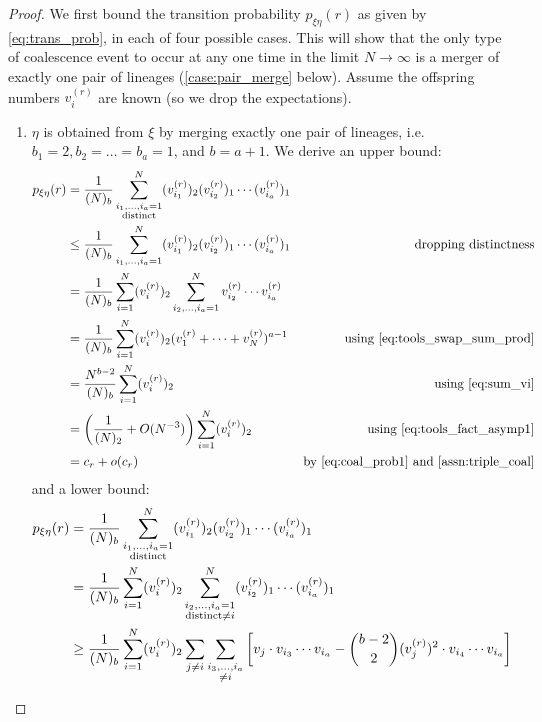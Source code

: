 \documentclass{article}
\begin{document}
\begin{proof}
We first bound the transition probability $p_{\xi\eta}(r)$ as given by \eqref{eq:trans_prob}, in each of four possible cases. This will show that the only type of coalescence event to occur at any one time in the limit $N\to\infty$ is a merger of exactly one pair of lineages (\ref{case:pair_merge} below). 
Assume the offspring numbers $v_i^{(r)}$ are known (so we drop the expectations).
\begin{enumerate}[label = \textbf{Case \arabic*.}]
\item\label{case:pair_merge} $\eta$ is obtained from $\xi$ by merging exactly one pair of lineages, i.e.\ $b_1=2, b_2=\dots=b_a=1$, and $b=a+1$. We derive an upper bound:
\begin{align}
p_{\xi\eta}(r) &= \frac{1}{(N)_b} \sum_{\substack{i_1,\dots,i_a =1 \\ \text{distinct}}}^{N} (v_{i_1}^{(r)})_2(v_{i_2}^{(r)})_1\cdots (v_{i_a}^{(r)})_1 &\notag\\
&\leq \frac{1}{(N)_b} \sum_{i_1,\dots,i_a=1}^N (v_{i_1}^{(r)})_2 (v_{i_2}^{(r)})_1 \cdots (v_{i_a}^{(r)})_1 &\text{dropping distinctness} \notag\\
&= \frac{1}{(N)_b} \sum_{i=1}^N (v_i^{(r)})_2 \sum_{i_2,\dots,i_a=1}^N v_{i_2}^{(r)} \cdots v_{i_a}^{(r)} & \notag\\
&= \frac{1}{(N)_b} \sum_{i=1}^N (v_i^{(r)})_2 (v_1^{(r)} + \dots + v_N^{(r)})^{a-1} & \text{using \eqref{eq:tools_swap_sum_prod}} \notag\\
&= \frac{N^{b-2}}{(N)_b} \sum_{i=1}^N (v_i^{(r)})_2 & \text{using \eqref{eq:sum_vi}} \notag\\
&= \left( \frac{1}{(N)_2} + O(N^{-3}) \right) \sum_{i=1}^N (v_i^{(r)})_2 & \text{using \eqref{eq:tools_fact_asymp1}} \label{eq:case1_upper}\\
&= c_r + o(c_r) & \text{by \eqref{eq:coal_prob1} and \ref{assn:triple_coal}} \notag
\end{align}
and a lower bound:
\begin{align}
p_{\xi\eta}(r) &= \frac{1}{(N)_b} \sum_{\substack{i_1,\dots,i_a =1 \\ \text{distinct}}}^{N} (v_{i_1}^{(r)})_2(v_{i_2}^{(r)})_1\cdots (v_{i_a}^{(r)})_1 &\notag\\
&= \frac{1}{(N)_b} \sum_{i=1}^N (v_i^{(r)})_2 \sum_{\substack{i_2,\dots,i_a =1 \\ \text{distinct} \neq i }}^{N} (v_{i_2}^{(r)})_1\cdots (v_{i_a}^{(r)})_1 &\notag\\
&\geq \frac{1}{(N)_b} \sum_{i=1}^N (v_i^{(r)})_2 \sum_{j\neq i} \sum_{\substack{i_3,\dots,i_a\\ \neq i}}\left[ v_j\cdot v_{i_3}\cdots v_{i_a} - \binom{b-2}{2}(v_j^{(r)})^2 \cdot v_{i_4}\cdots v_{i_a} \right] & \label{eq:transprob_lowerbd}\\

\end{align}
\end{enumerate}
\end{proof}
\end{document}
